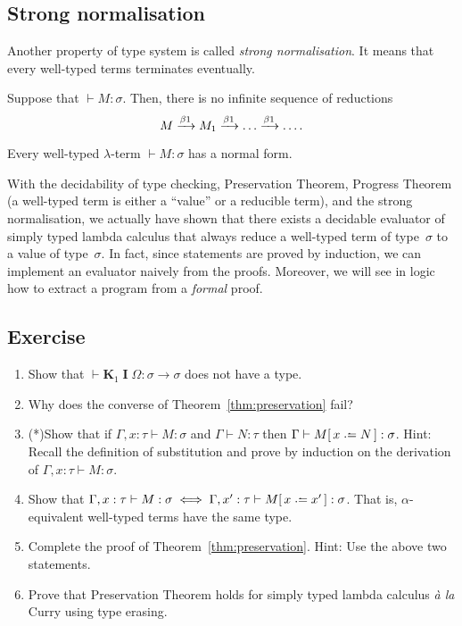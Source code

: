 \subsection{Strong normalisation}
Another property of type system is called \emph{strong normalisation}. It means
that every well-typed terms terminates eventually. 
\begin{theorem}
  Suppose that ${}\vdash M : \sigma$. Then,
  there is no infinite sequence of reductions
  \[
    M \xrightarrow{\beta1} M_1 \xrightarrow{\beta1} \dots \xrightarrow{\beta1} \dots.
  \]
\end{theorem}
\begin{corollary}
  Every well-typed $\lambda$-term ${}\vdash M:\sigma$ has a normal form.
\end{corollary}
With the decidability of type checking, Preservation Theorem, Progress Theorem
(a well-typed term is either a ``value'' or a reducible term), and the strong
normalisation, we actually have shown that there exists a decidable evaluator of
simply typed lambda calculus that always reduce a well-typed term of
type~$\sigma$ to a value of type~$\sigma$. In fact, since statements are proved
by induction, we can implement an evaluator naively from the proofs. Moreover,
we will see in logic how to extract a program from a \emph{formal} proof.

\subsection*{Exercise}
\begin{enumerate}
  \item Show that $\vdash \mathbf{K}_1\;\mathbf{I}\;\Omega : \sigma \to \sigma$
    does not have a type.
  \item Why does the converse of Theorem~\ref{thm:preservation} fail?
  \item (*)Show that if $\Gamma, x : \tau \vdash M : \sigma$
    and $\Gamma \vdash N : \tau$ then $\Gamma \vdash M\subst{x}{N} : \sigma$.
    Hint: Recall the definition of substitution and prove by induction
    on the derivation of $\Gamma, x:\tau\vdash M : \sigma$.
  \item Show that $\Gamma, x : \tau \vdash M :\sigma
    \iff \Gamma, x' : \tau \vdash M\subst{x}{x'} : \sigma$. That is,
    $\alpha$-equivalent well-typed terms have the same type.
  \item Complete the proof of Theorem~\ref{thm:preservation}. Hint: Use the
    above two statements.
  \item Prove that Preservation Theorem holds for simply typed lambda calculus
    \textit{\`a la} Curry using type erasing.
\end{enumerate}
